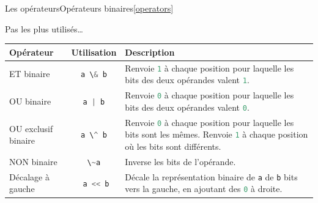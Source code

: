 \documentclass{beamer}
\begin{document}
    \begin{frame}{Les opérateurs}{Opérateurs binaires\cref{operators}}
        \begin{scriptsize}
            Pas les plus utilisés\ldots
            \begin{table}[h!]
                \centering
                \begin{tabular}{|p{3cm}|c|p{6cm}|}
                    \hline
                    \textbf{Opérateur}                                                      & \textbf{Utilisation}                     & \textbf{Description}                                                                                                                                                                                                           \\
                    \hline
                    ET binaire                                                              & \lstinline[language=Javascript]!a \& b!  & Renvoie \lstinline[language=Javascript]!1! à chaque position pour laquelle les bits des deux opérandes valent \lstinline[language=Javascript]!1!.                                                                              \\
                    \hline
                    OU binaire                                                              & \lstinline[language=Javascript]!a | b!   & Renvoie \lstinline[language=Javascript]!0! à chaque position pour laquelle les bits des deux opérandes valent \lstinline[language=Javascript]!0!.                                                                              \\
                    \hline
                    OU exclusif binaire                                                     & \lstinline[language=Javascript]!a \^ b!  & Renvoie \lstinline[language=Javascript]!0! à chaque position pour laquelle les bits sont les mêmes. Renvoie \lstinline[language=Javascript]!1! à chaque position où les bits sont différents.                                  \\
                    \hline
                    NON binaire                                                             & \lstinline[language=Javascript]!\~a!     & Inverse les bits de l'opérande.                                                                                                                                                                                                \\
                    \hline
                    Décalage à gauche                                                       & \lstinline[language=Javascript]! a << b! & Décale la représentation binaire de \lstinline[language=Javascript]!a! de \lstinline[language=Javascript]!b! bits vers la gauche, en ajoutant des \lstinline[language=Javascript]!0! à droite.                                 \\

\end{tabular}
\end{table}
\end{scriptsize}
\end{frame}
\end{document}
